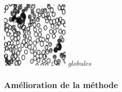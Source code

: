 \documentclass[a4,12pt]{article}
\begin{document}
\begin{minipage}[c]{0.20\linewidth}
	\begin{center}
		\includegraphics[width = 33mm]{./img/p2test_grad_mean_globules.jpg}
		\textit{globules}
	\end{center}
\end{minipage}

\subsubsection{Amélioration de la méthode}
\end{document}
